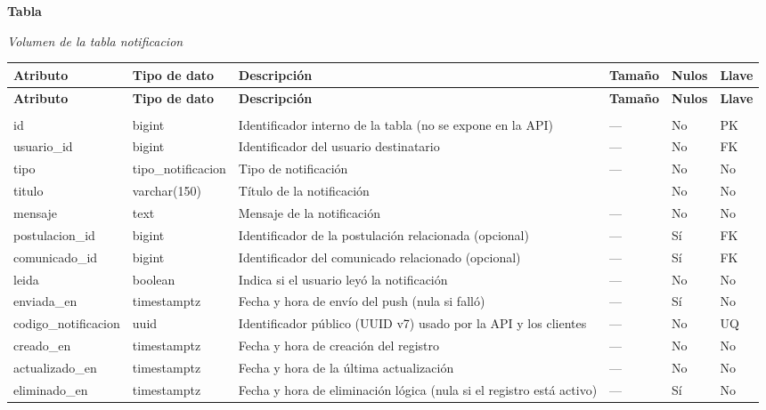 \label{tab:volumen_notificacion}
\noindent\textbf{Tabla~\thetable}\par\nopagebreak
\noindent\textit{Volumen de la tabla notificacion}\par\nopagebreak
\begingroup\small\linespread{1}\selectfont\setlength{\tabcolsep}{4pt}
\begin{longtable}{>{\raggedright\arraybackslash}p{3.4cm} >{\raggedright\arraybackslash}p{2.5cm} >{\raggedright\arraybackslash}p{4.8cm} >{\centering\arraybackslash}p{1.6cm}>{\centering\arraybackslash}p{1.1cm} >{\centering\arraybackslash}p{1.3cm}}
\toprule
\textbf{Atributo} & \textbf{Tipo de dato} & \textbf{Descripción} & \textbf{Tamaño} & \textbf{Nulos} & \textbf{Llave} \\
\midrule
\endfirsthead
\toprule
\textbf{Atributo} & \textbf{Tipo de dato} & \textbf{Descripción} & \textbf{Tamaño} & \textbf{Nulos} & \textbf{Llave} \\
\midrule
\endhead
\endfoot
\bottomrule
\multicolumn{6}{l}{\textit{Nota.} Elaboración propia.} \\
\endlastfoot
id & bigint & Identificador interno de la tabla (no se expone en la API) & — & No & PK \\
usuario\_\allowbreak{}id & bigint & Identificador del usuario destinatario & — & No & FK \\
tipo & tipo\_\allowbreak{}notificacion & Tipo de notificación & — & No & No \\
titulo & varchar(150) & Título de la notificación & 150 & No & No \\
mensaje & text & Mensaje de la notificación & — & No & No \\
postulacion\_\allowbreak{}id & bigint & Identificador de la postulación relacionada (opcional) & — & Sí & FK \\
comunicado\_\allowbreak{}id & bigint & Identificador del comunicado relacionado (opcional) & — & Sí & FK \\
leida & boolean & Indica si el usuario leyó la notificación & — & No & No \\
enviada\_\allowbreak{}en & timestamptz & Fecha y hora de envío del push (nula si falló) & — & Sí & No \\
codigo\_\allowbreak{}notificacion & uuid & Identificador público (UUID v7) usado por la API y los clientes & — & No & UQ \\
creado\_\allowbreak{}en & timestamptz & Fecha y hora de creación del registro & — & No & No \\
actualizado\_\allowbreak{}en & timestamptz & Fecha y hora de la última actualización & — & No & No \\
eliminado\_\allowbreak{}en & timestamptz & Fecha y hora de eliminación lógica (nula si el registro está activo) & — & Sí & No \\
\end{longtable}
\endgroup
\addtocounter{table}{-1}

